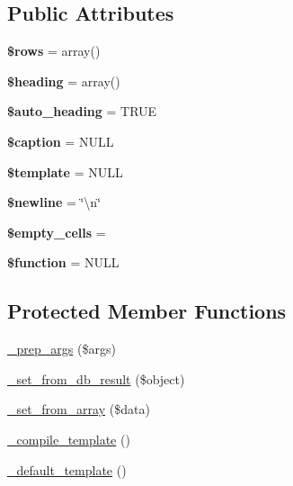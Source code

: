 \subsection*{Public Attributes}
\begin{DoxyCompactItemize}
\item 
\mbox{\label{class_c_i___table_a4b5a384ac63790e95c9d324a812a81f8}} 
{\bfseries \$rows} = array()
\item 
\mbox{\label{class_c_i___table_aadd5ddeff82c4a6d3c7bb807e482b580}} 
{\bfseries \$heading} = array()
\item 
\mbox{\label{class_c_i___table_a26c795c8c50f935077f1c6eaf464d504}} 
{\bfseries \$auto\+\_\+heading} = T\+R\+UE
\item 
\mbox{\label{class_c_i___table_afa1f37302cd9a49d239ee3b5e05f167f}} 
{\bfseries \$caption} = N\+U\+LL
\item 
\mbox{\label{class_c_i___table_a8be5af2d026be8b01370692772a2a9a0}} 
{\bfseries \$template} = N\+U\+LL
\item 
\mbox{\label{class_c_i___table_ace589c81317ea4d872d8a8ae3c29e675}} 
{\bfseries \$newline} = \char`\"{}\textbackslash{}n\char`\"{}
\item 
\mbox{\label{class_c_i___table_af0bfa8ea27b7199cb7b22cb3712e8c6b}} 
{\bfseries \$empty\+\_\+cells} = \textquotesingle{}\textquotesingle{}
\item 
\mbox{\label{class_c_i___table_af1a73d24ef0525969c6b41c087c75e46}} 
{\bfseries \$function} = N\+U\+LL
\end{DoxyCompactItemize}
\subsection*{Protected Member Functions}
\begin{DoxyCompactItemize}
\item 
\mbox{\hyperlink{class_c_i___table_a74e7e96f438364bdb9e20ae5f75fddeb}{\+\_\+prep\+\_\+args}} (\$args)
\item 
\mbox{\hyperlink{class_c_i___table_a9892d6dcd1875dd22ad3d206ce12134e}{\+\_\+set\+\_\+from\+\_\+db\+\_\+result}} (\$object)
\item 
\mbox{\hyperlink{class_c_i___table_af6649afb3ad3b8187d11aea588f82296}{\+\_\+set\+\_\+from\+\_\+array}} (\$data)
\item 
\mbox{\hyperlink{class_c_i___table_afc336bcb2396eddb9e45a1d9e481b418}{\+\_\+compile\+\_\+template}} ()
\item 
\mbox{\hyperlink{class_c_i___table_a1e130e424d32d8c1cd77af17f1343061}{\+\_\+default\+\_\+template}} ()
\end{DoxyCompactItemize}


